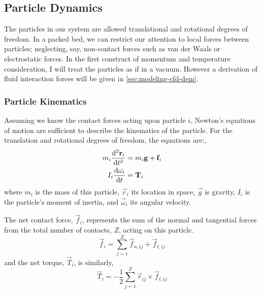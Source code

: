 \subsection{Particle Dynamics}\label{sec:particle-dynamics}

The particles in our system are allowed translational and rotational degrees of freedom. In a packed bed, we can restrict our attention to local forces between particles; neglecting, say, non-contact forces such as van der Waals or electrostatic forces. In the first construct of momentum and temperature consideration, I will treat the particles as if in a vacuum. However a derivation of fluid interaction forces will be given in \cref{sec:modeling-cfd-dem}.



\subsubsection{Particle Kinematics}

Assuming we know the contact forces acting upon particle $i$, Newton's equations of motion are sufficient to describe the kinematics of the particle. For the translation and rotational degrees of freedom, the equations are:,
\begin{subequations}
\label{eq:newtons-second}
\begin{align}
	m_i  \frac{\mathrm{d}^2{\mathbf{r}_i}}{\mathrm{d}t^2}   & = m_i\mathbf{g} + \mathbf{f}_i \label{eq:newton-translational} \\
	I_i\frac{\mathrm{d}{\mathbf{\omega}_i}}{\mathrm{d}t} & = \mathbf{T}_i \label{eq:newton-rotational}
\end{align}
\end{subequations}
where $m_i$ is the mass of this particle, $\vec{r}_i$ its location in space, $\vec{g}$ is gravity, $I_i$ is the particle's moment of inertia, and $\vec{\omega}_i$ its angular velocity.

The net contact force, $\vec{f}_i$, represents the sum of the normal and tangential forces from the total number of contacts, $Z$, acting on this particle.
\begin{equation}
 	\vec{f}_i = \sum_{j=1}^{Z} \vec{f}_{n,ij} + \vec{f}_{t,ij}
 \end{equation} 
and the net torque, $\vec{T}_i$, is similarly,
\begin{equation}
	\vec{T}_i = -\frac{1}{2}\sum_{j=1}^{Z} \vec{r}_{ij} \times \vec{f}_{t,ij}
\end{equation}

